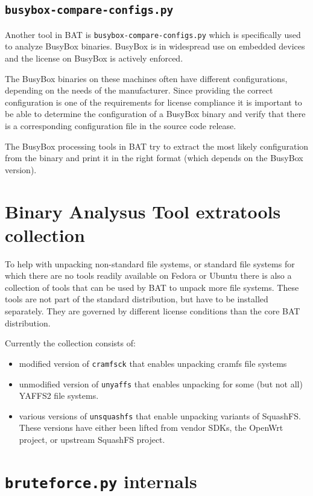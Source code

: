 \documentclass[10pt]{article}
\begin{document}
\subsection{\texttt{busybox-compare-configs.py}}

Another tool in BAT is \texttt{busybox-compare-configs.py} which is specifically
used to analyze BusyBox binaries. BusyBox is in widespread use on embedded
devices and the license on BusyBox is actively enforced.

The BusyBox binaries on these machines often have different configurations,
depending on the needs of the manufacturer. Since providing the correct
configuration is one of the requirements for license compliance it is important
to be able to determine the configuration of a BusyBox binary and verify that
there is a corresponding configuration file in the source code release.

The BusyBox processing tools in BAT try to extract the most likely
configuration from the binary and print it in the right format (which
depends on the BusyBox version).

\section{Binary Analysus Tool extratools collection}

To help with unpacking non-standard file systems, or standard file systems for
which there are no tools readily available on Fedora or Ubuntu there is also
a collection of tools that can be used by BAT to unpack more file systems.
These tools are not part of the standard distribution, but have to be installed
separately. They are governed by different license conditions than the core BAT
distribution.

Currently the collection consists of:

\begin{itemize}
\item modified version of \texttt{cramfsck} that enables unpacking cramfs
file systems
\item unmodified version of \texttt{unyaffs} that enables unpacking for some
(but not all) YAFFS2 file systems.
\item various versions of \texttt{unsquashfs} that enable unpacking variants
of SquashFS. These versions have either been lifted from vendor SDKs, the
OpenWrt project, or upstream SquashFS project.
\end{itemize}

\section{\texttt{bruteforce.py} internals}
\end{document}
